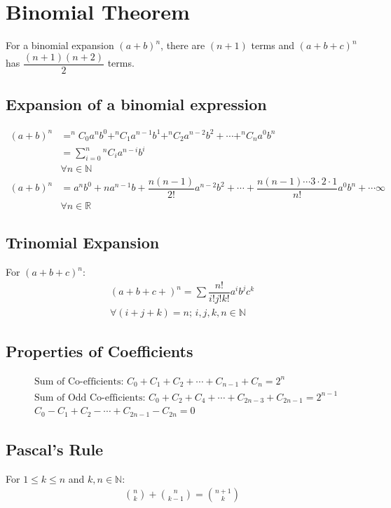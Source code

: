 \documentclass[../main.tex]{subfiles}
\begin{document}
	\chapter{Binomial Theorem}
	For a binomial expansion $(a+b)^n$, there are $(n+1)$ terms and $(a+b+c)^n$ has $\dfrac{(n+1)(n+2)}{2}$ terms.
	\section{Expansion of a binomial expression}
	\begin{align}
				(a+b)^n & = ^nC_0 a^n b^0 + ^nC_1 a^{n-1} b^1 + ^nC_2 a^{n-2} b^2 + \cdots + ^nC_n a^0 b^n \nonumber \\
				& = \sum_{i=0}^{n} {^nC_{i}} a^{n-i} b^i \nonumber \\
				& \forall n \in \mathbb{N}\\				
				(a+b)^n & = a^n b^0 + na^{n-1} b + \dfrac{n(n-1)}{2!} a^{n-2} b^2  + \cdots + \dfrac{n(n-1) \cdots 3 \cdot 2 \cdot 1}{n!} a^0 b^n + \cdots \infty \nonumber\\
				&\forall n \in \mathbb{R}
	\end{align}
	
	\section{Trinomial Expansion}
	For $(a+b+c)^n$:
	\begin{align}
		(a+b+c+)^n = \sum \dfrac{n!}{i! j! k!} a^i b^j c^k \nonumber\\
		\forall (i+j+k) = n \text{; } i,j,k,n \in \mathbb{N}
	\end{align}
	
	\section{Properties of Coefficients}
	\begin{align}
		&\text{Sum of Co-efficients: } C_0 + C_1 + C_2 + \cdots + C_{n-1} + C_n = 2^n\\
		&\text{Sum of Odd Co-efficients: } C_0 + C_2 + C_4 + \cdots + C_{2n-3} + C_{2n-1} = 2^{n-1}\\
		& C_0 - C_1 + C_2 - \cdots + C_{2n-1} - C_{2n} = 0
	\end{align}
	
	\section{Pascal's Rule}
	For $1 \leq k \leq n$ and  $k,n \in \mathbb{N}$:
	\begin{align}
		{{n}\choose{k}} + {{n}\choose{k-1}} = {{n+1}\choose{k}} 
	\end{align}
\end{document}
